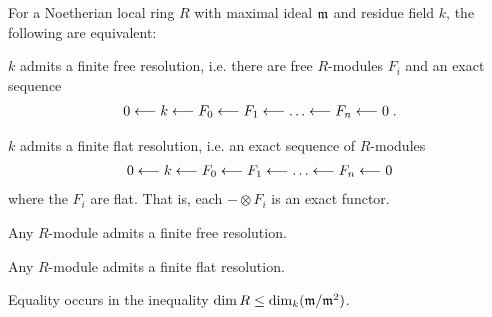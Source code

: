 \documentclass[a4paper,parskip=half,numbers=enddot, DIV=12]{scrreprt}
\begin{document}
\begin{thm}[Serre] 
    For a Noetherian local ring $R$ with maximal ideal $\mathfrak{m}$ and residue field $k$, the following are equivalent:
    \begin{alphanumerate}
    \item 
        $k$ admits a finite free resolution, i.e. there are free $R$-modules $F_i$ and an exact sequence
            \begin{align*}
                0 \lmorphism k \lmorphism F_0 \lmorphism F_1 \lmorphism \ldots \lmorphism F_n \lmorphism 0\;.
            \end{align*}
    \item 
        $k$ admits a finite flat resolution, i.e. an exact sequence of $R$-modules
            \begin{align*}
                0 \lmorphism k \lmorphism F_0 \lmorphism F_1 \lmorphism \ldots \lmorphism F_n \lmorphism 0
            \end{align*}
        where the $F_i$ are flat. That is, each $-\otimes F_i$ is an exact functor.
    \item 
        Any $R$-module admits a finite free resolution.
    \item 
        Any $R$-module admits a finite flat resolution.
    \item 
        Equality occurs in the inequality $\dim R \leq \dim_k (\mathfrak{m}/\mathfrak{m}^2)$.
    \end{alphanumerate}
\end{thm}
\end{document}
